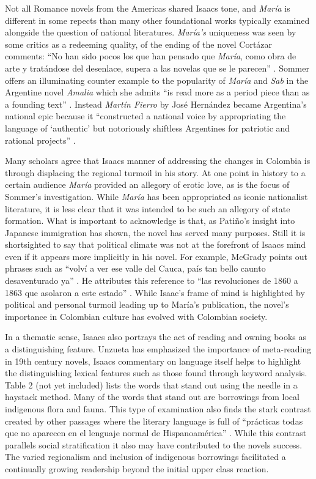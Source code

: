 \documentclass[12pt]{report}\usepackage[]{graphicx}\usepackage[]{color}
\begin{document}
\begin{spacing}{1.9}
Not all Romance novels from the Americas shared Isaacs tone, and \textit{María} is different in some repects than many other foundational works typically examined alongside the question of national literatures.
\textit{María's} uniqueness was seen by some critics as a redeeming quality, of the ending of the novel Cortázar comments: \enquote{No han sido pocos los que han pensado que \textit{María}, como obra de arte y tratándose del desenlace, supera a las novelas que se le parecen} \autocite[57]{Cortazar1908}.
Sommer offers an illuminating counter example to the popularity of \textit{María} and \textit{Sab} in the Argentine novel \textit{Amalia} which she admits \enquote{is read more as a period piece than as a founding text} \autocite[111]{Sommer1991}.
Instead \textit{Martín Fierro} by José Hernández became Argentina's national epic because it \enquote{constructed a national voice by appropriating the language of \enquote{authentic} but notoriously shiftless Argentines for patriotic and rational projects} \autocite[111]{Sommer1991}.


Many scholars agree that Isaacs manner of addressing the changes in Colombia is through displacing the regional turmoil in his story. 
At one point in history to a certain audience \textit{María} provided an allegory of erotic love, as is the focus of Sommer’s investigation. 
While \textit{María} has been appropriated as iconic nationalist literature, it is less clear that it was intended to be such an allegory of state formation.
What is important to acknowledge is that, as Patiño's insight into Japanese immigration has shown, the novel has served many purposes. 
Still it is shortsighted to say that political climate was not at the forefront of Isaacs mind even if it appears more implicitly in his novel.
For example, McGrady points out phrases such as \enquote{volví a ver ese valle del Cauca, país tan bello caunto desaventurado ya} \autocite[314]{McGrady2012}.
He attributes this reference to \enquote{las revoluciones de 1860 a 1863 que asolaron a este estado} \autocite[314]{McGrady2012}.
While Isaac's frame of mind is highlighted by political and personal turmoil leading up to María's publication, the novel's importance in Colombian culture has evolved with Colombian society.


In a thematic sense, Isaacs also portrays the act of reading and owning books as a distinguishing feature. 
Unzueta has emphasized the importance of meta-reading in 19th century novels, Isaacs commentary on language itself helps to highlight the distinguishing lexical features such as those found through keyword analysis.
Table 2 (not yet included) lists the words that stand out using the needle in a haystack method.
Many of the words that stand out are borrowings from local indigenous flora and fauna.
This type of examination also finds the stark contrast created by other passages where the literary language is full of \enquote{prácticas todas que no aparecen en el lenguaje normal de Hispanoamérica} \autocite[42]{McGrady2012}.
While this contrast parallels social stratification it also may have contributed to the novels success.
The varied regionalism and inclusion of indigenous borrowings facilitated a continually growing readership beyond the initial upper class reaction.


\end{spacing}
\end{document}
